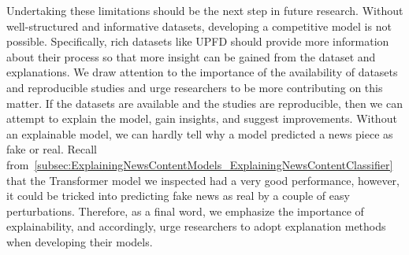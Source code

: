 Undertaking these limitations should be the next step in future research. Without well-structured and informative datasets, developing a competitive model is not possible. Specifically, rich datasets like UPFD should provide more information about their process so that more insight can be gained from the dataset and explanations. We draw attention to the importance of the availability of datasets and reproducible studies and urge researchers to be more contributing on this matter. If the datasets are available and the studies are reproducible, then we can attempt to explain the model, gain insights, and suggest improvements. Without an explainable model, we can hardly tell why a model predicted a news piece as fake or real. Recall from~\ref{subsec:ExplainingNewsContentModels_ExplainingNewsContentClassifier} that the Transformer model we inspected had a very good performance, however, it could be tricked into predicting fake news as real by a couple of easy perturbations. Therefore, as a final word, we emphasize the importance of explainability, and accordingly, urge researchers to adopt explanation methods when developing their models.